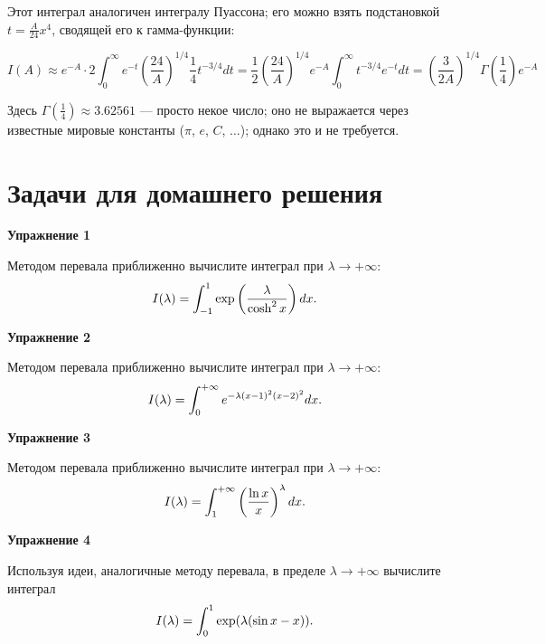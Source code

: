 \documentclass[a4paper,12pt]{article}
\begin{document}
\noindent
Этот интеграл аналогичен интегралу Пуассона; его можно взять подстановкой
$t=\frac{A}{24}x^{4}$, сводящей его к гамма-функции:

\[
I(A)\approx e^{-A}\cdot2\int_{0}^{\infty}e^{-t}\left(\frac{24}{A}\right)^{1/4}\frac{1}{4}t^{-3/4}dt=\frac{1}{2}\left(\frac{24}{A}\right)^{1/4}e^{-A}\int_{0}^{\infty}t^{-3/4}e^{-t}dt=\left(\frac{3}{2A}\right)^{1/4}\Gamma\left(\frac{1}{4}\right)e^{-A}
\]

\noindent
Здесь $\Gamma\left(\frac{1}{4}\right)\approx3.62561$ --- просто некое
число; оно не выражается через известные мировые константы ($\pi$,
$e$, $C$, $\dots$); однако это и не требуется.

\section*{Задачи для домашнего решения}

\noindent \textbf{Упражнение 1}

\noindent Методом перевала приближенно вычислите интеграл при $\lambda\rightarrow+\infty$:
\begin{equation}
I(\lambda)=\int_{-1}^{1}\exp\left(\frac{\lambda}{\cosh^{2}x}\right)dx\text{.}	
\notag
\end{equation}

\vspace{15pt}
\noindent \textbf{Упражнение 2}

\noindent Методом перевала приближенно вычислите интеграл при $\lambda\rightarrow+\infty$:
\begin{equation}\notag
I(\lambda)	=\int_{0}^{+\infty}e^{-\lambda(x-1)^{2}(x-2)^{2}}dx.
\end{equation}

\vspace{15pt}
\noindent \textbf{Упражнение 3}

\noindent Методом перевала приближенно вычислите интеграл при $\lambda\rightarrow+\infty$:
\begin{equation}\notag
I(\lambda)=\int_{1}^{+\infty}\left(\frac{\ln x}{x}\right)^{\lambda}dx.	
\end{equation}

\vspace{15pt}
\noindent \textbf{Упражнение 4}

\noindent Используя идеи, аналогичные методу перевала, в пределе $\lambda\rightarrow+\infty$ вычислите интеграл
\begin{equation}\notag
I(\lambda)	=\int_{0}^{1}\exp(\lambda(\sin x-x)).
\end{equation}
\end{document}
